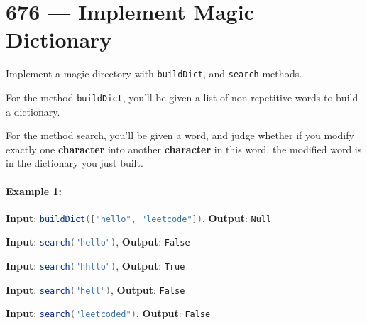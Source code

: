 \section{676 --- Implement Magic Dictionary}
Implement a magic directory with \lstinline[language=Java, basicstyle=\small\ttfamily, keywordstyle=\bfseries\color{green!40!black}]|buildDict|, and \lstinline[language=Java, basicstyle=\small\ttfamily, keywordstyle=\bfseries\color{green!40!black}]|search| methods.

For the method \lstinline[language=Java, basicstyle=\small\ttfamily, keywordstyle=\bfseries\color{green!40!black}]|buildDict|, you'll be given a list of non-repetitive words to build a dictionary.

For the method search, you'll be given a word, and judge whether if you modify exactly one \textbf{character} into another \textbf{character} in this word, the modified word is in the dictionary you just built.

\paragraph{Example 1:}
\begin{flushleft}


\textbf{Input}: \lstinline[language=Java, basicstyle=\small\ttfamily, keywordstyle=\bfseries\color{green!40!black}]|buildDict(["hello", "leetcode"])|, \textbf{Output}: \lstinline[language=Java, basicstyle=\small\ttfamily, keywordstyle=\bfseries\color{green!40!black}]|Null|

\textbf{Input}: \lstinline[language=Java, basicstyle=\small\ttfamily, keywordstyle=\bfseries\color{green!40!black}]|search("hello")|, \textbf{Output}: \lstinline[language=Java, basicstyle=\small\ttfamily, keywordstyle=\bfseries\color{green!40!black}]|False|

\textbf{Input}: \lstinline[language=Java, basicstyle=\small\ttfamily, keywordstyle=\bfseries\color{green!40!black}]|search("hhllo")|, \textbf{Output}: \lstinline[language=Java, basicstyle=\small\ttfamily, keywordstyle=\bfseries\color{green!40!black}]|True|

\textbf{Input}: \lstinline[language=Java, basicstyle=\small\ttfamily, keywordstyle=\bfseries\color{green!40!black}]|search("hell")|, \textbf{Output}: \lstinline[language=Java, basicstyle=\small\ttfamily, keywordstyle=\bfseries\color{green!40!black}]|False|

\textbf{Input}: \lstinline[language=Java, basicstyle=\small\ttfamily, keywordstyle=\bfseries\color{green!40!black}]|search("leetcoded")|, \textbf{Output}: \lstinline[language=Java, basicstyle=\small\ttfamily, keywordstyle=\bfseries\color{green!40!black}]|False|
\end{flushleft}
